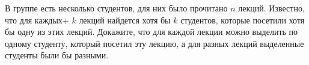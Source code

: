 В группе есть несколько студентов, для них было прочитано $n$ лекций. Известно, что для каждых+ $k$ лекций найдется хотя бы
$k$ студентов, которые посетили хотя бы одну из этих лекций. Докажите, что для каждой лекции можно выделить по одному
студенту, который посетил эту лекцию, а для разных лекций выделенные студенты были бы разными.